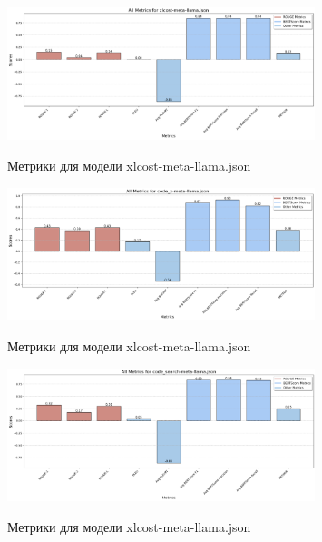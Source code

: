 \documentclass[14pt]{article}
\theoremstyle{definition}
\begin{document}
\newpage
\begin{figure}[H]
    \centering
    \includegraphics[width=0.8\textwidth]{xlcost-meta-llama.png}
    \caption{Метрики для модели xlcost-meta-llama.json} \cite{github_repo}
    \label{fig:xlcost}
\end{figure}
    
    \vspace{1em}
    
\begin{figure}[H]
    \centering
    \includegraphics[width=0.8\textwidth]{code_x-meta-llama.png}
    \caption{Метрики для модели xlcost-meta-llama.json} \cite{github_repo}
    \label{fig:code_x}
\end{figure}

    
    \vspace{1em}
\begin{figure}[H]
    \centering
    \includegraphics[width=0.8\textwidth]{code_search-meta-llama.png}
    \caption{Метрики для модели xlcost-meta-llama.json} \cite{github_repo}
    \label{fig:code_search}
\end{figure}
\end{document}
